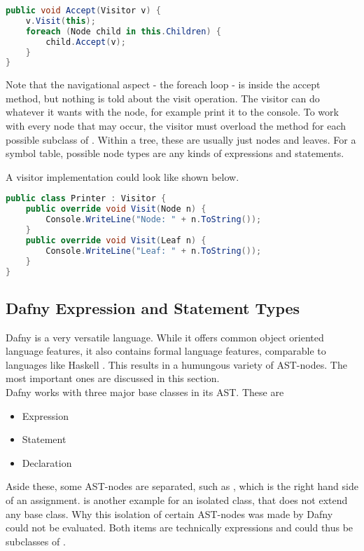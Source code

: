 \begin{lstlisting}[language=csharp, caption={Example for Accept}, captionpos=b, label={lst:accept}]
public void Accept(Visitor v) {
    v.Visit(this);
    foreach (Node child in this.Children) {
        child.Accept(v);
    }
}
\end{lstlisting}

Note that the navigational aspect - the foreach loop - is inside the accept method, but nothing is told about the visit operation.
The visitor can do whatever it wants with the node, for example print it to the console.
To work with every node that may occur, the visitor must overload the  method for each possible subclass of .
Within a tree, these are usually just nodes and leaves.
For a symbol table, possible node types are any kinds of expressions and statements.

A visitor implementation could look like shown below.

\begin{lstlisting}[language=csharp, caption={Example for Visitor}, captionpos=b, label={lst:visitor}]
public class Printer : Visitor {
    public override void Visit(Node n) {
        Console.WriteLine("Node: " + n.ToString());
    }
    public override void Visit(Leaf n) {
        Console.WriteLine("Leaf: " + n.ToString());
    }
}
\end{lstlisting}

\subsection{Dafny Expression and Statement Types}
\label{section:analysis_dafnyASTStuff}
Dafny is a very versatile language.
While it offers common object oriented language features, it also contains formal language features, comparable to languages like Haskell \cite{haskell}.
This results in a humungous variety of AST-nodes.
The most important ones are discussed in this section.\\

Dafny works with three major base classes in its AST.
These are
\begin{itemize}
    \item Expression
    \item Statement
    \item Declaration
\end{itemize}
Aside these, some AST-nodes are separated, such as , which is the right hand side of an assignment.
 is another example for an isolated class, that does not extend any base class.
Why this isolation of certain AST-nodes was made by Dafny could not be evaluated.
Both items are technically expressions and could thus be subclasses of .

